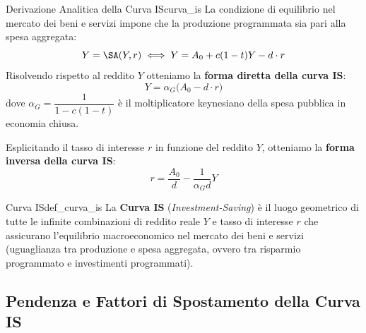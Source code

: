 \begin{modello}{Derivazione Analitica della Curva IS}{curva_is}
La condizione di equilibrio nel mercato dei beni e servizi impone che la produzione programmata sia pari alla spesa aggregata:
\begin{equation}
    Y = \SA(Y, r) \iff Y = A_0 + c(1-t)Y - d \cdot r
\end{equation}
Risolvendo rispetto al reddito $Y$ otteniamo la \textbf{forma diretta della curva IS}:
\begin{equation}
    Y = \alpha_G \Big( A_0 - d \cdot r \Big) \label{eq:is_diretta}
\end{equation}
dove $\alpha_G = \dfrac{1}{1 - c(1-t)}$ è il moltiplicatore keynesiano della spesa pubblica in economia chiusa.

Esplicitando il tasso di interesse $r$ in funzione del reddito $Y$, otteniamo la \textbf{forma inversa della curva IS}:
\begin{equation}
    r = \frac{A_0}{d} - \frac{1}{\alpha_G d} Y \label{eq:is_inversa}
\end{equation}
\end{modello}

\begin{definizione}{Curva IS}{def_curva_is}
La \textbf{Curva IS} (\textit{Investment-Saving}) è il luogo geometrico di tutte le infinite combinazioni di reddito reale $Y$ e tasso di interesse $r$ che assicurano l'equilibrio macroeconomico nel mercato dei beni e servizi (uguaglianza tra produzione e spesa aggregata, ovvero tra risparmio programmato e investimenti programmati).
\end{definizione}

\subsection{Pendenza e Fattori di Spostamento della Curva IS}

